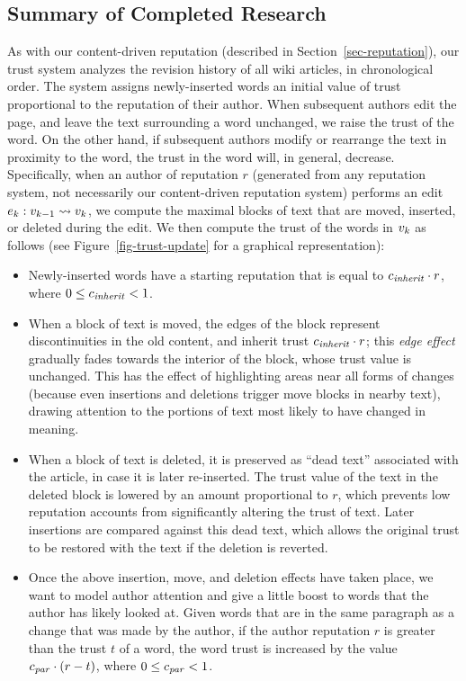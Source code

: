 \subsection{Summary of Completed Research}

As with our content-driven reputation (described in Section~\ref{sec-reputation}),
our trust system analyzes the revision history of all wiki articles,
in chronological order.
The system assigns newly-inserted words an initial value of
trust proportional to the reputation of their author.
When subsequent authors edit the page, and leave the text surrounding
a word unchanged,  we raise the trust of the word.
On the other hand, if subsequent authors modify or rearrange the text
in proximity to the word, the trust in the word will, in general, decrease.
%
Specifically, when an author of reputation $r$
(generated from any reputation system, not necessarily
our content-driven reputation system) performs an edit
$e_{k} : v_{k-1} \rightsquigarrow v_{k}$,
we compute the maximal blocks of text that are
moved, inserted, or deleted during the edit.
We then compute the trust of the words in $v_{k}$ as follows
(see Figure~\ref{fig-trust-update} for a graphical representation):
%
\begin{itemize}

\item Newly-inserted words have a starting reputation that is equal to
  ${c_{{\text{\textit{inherit}}}}} \cdot r$, where $0 \le {c_{{\text{\textit{inherit}}}}} < 1$.

\item When a block of text is moved, the edges of the block represent
  discontinuities in the old content, and inherit trust
  ${c_{{\text{\textit{inherit}}}}} \cdot r$;
  this {\em edge effect\/} gradually fades towards the interior of the
  block, whose trust value is unchanged.
  This has the effect of highlighting areas near all forms of changes
  (because even insertions and deletions trigger move blocks in
  nearby text), drawing attention to the portions of text most
  likely to have changed in meaning.

\item When a block of text is deleted, it is preserved as ``dead
  text'' associated with the article, in case it is later
  re-inserted.
  The trust value of the text in the deleted block is lowered by an
  amount proportional to $r$, which prevents low reputation accounts
  from significantly altering the trust of text.
  Later insertions are compared against this dead text,
  which allows the original trust to be restored with the text
  if the deletion is reverted.

\item Once the above insertion, move, and deletion effects have taken
  place, we want to model author attention and give a little
  boost to words that the author has likely looked at.
  Given words that are in the same paragraph as a change
  that was made by the author,
  if the author reputation $r$ is greater than the trust $t$ of
  a word, the word trust is increased by the value
  ${c_{{\text{\textit{par}}}}} \cdot (r - t)$,
  where $0 \le {c_{{\text{\textit{par}}}}} < 1$.

\end{itemize}
